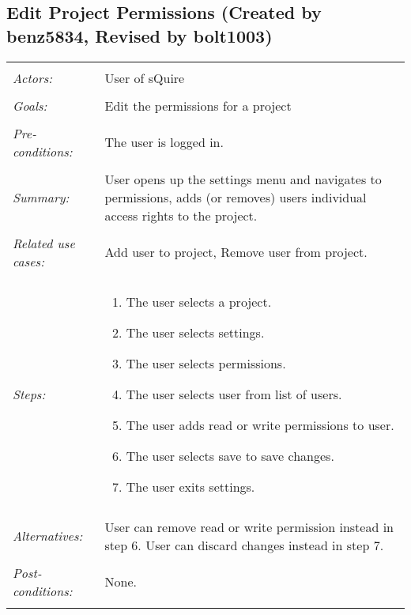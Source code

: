 \documentclass[11pt]{report}
\begin{document}
\subsection{Edit Project Permissions (Created by benz5834, Revised by bolt1003)}
\begin{tabular}{ p{2cm} p{12cm} }
 \hline
 \\
 \textit{Actors:} & User of sQuire \\ 
 \\
 \textit{Goals:} & Edit the permissions for a project \\
 \\
 \textit{Pre-conditions:} & The user is logged in. \\
 \\
 \textit{Summary:} & User opens up the settings menu and navigates to permissions, adds (or removes) users individual access rights to the project.  \\ 
 \\
 \textit{Related use cases:} & Add user to project, Remove user from project. \\ 
 \\
 \textit{Steps:} & \begin{enumerate}
  \item The user selects a project.
  \item The user selects settings.
  \item The user selects permissions.
  \item The user selects user from list of users.
  \item The user adds read or write permissions to user.
  \item The user selects save to save changes.
  \item The user exits settings.
 \end{enumerate} \\
 \\
 \textit{Alternatives:} & User can remove read or write permission instead in step 6. User can discard changes instead in step 7. \\
 \\
 \textit{Post-conditions:} & None. \\
 \\
\hline
\end{tabular}
\end{document}
